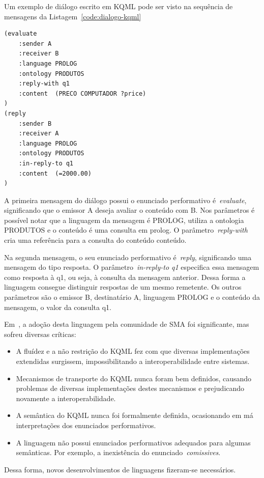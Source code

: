 Um exemplo de diálogo escrito em KQML pode ser visto na sequência de mensagens da Listagem~\ref{code:dialogo-kqml}

\begin{lstlisting}[label=code:dialogo-kqml,caption=Exemplo de diálogo em KQML]
(evaluate
	:sender A
	:receiver B
	:language PROLOG
	:ontology PRODUTOS
	:reply-with q1
	:content  (PRECO COMPUTADOR ?price)
)
(reply
	:sender B
	:receiver A
	:language PROLOG
	:ontology PRODUTOS
	:in-reply-to q1
	:content  (=2000.00)
)
\end{lstlisting}

A primeira mensagem do diálogo possui o enunciado performativo é~\emph{evaluate}, significando que o emissor A deseja avaliar o conteúdo com B. Nos parâmetros é possível notar que a linguagem da mensagem é PROLOG, utiliza a ontologia PRODUTOS e o conteúdo é uma consulta em prolog. O parâmetro~\emph{reply-with} cria uma referência para a consulta do conteúdo conteúdo.

Na segunda mensagem, o seu enunciado performativo é~\emph{reply}, significando uma mensagem do tipo resposta. O parâmetro~\emph{in-reply-to q1} especifica essa mensagem como resposta à q1, ou seja, à consulta da mensagem anterior. Dessa forma a linguagem consegue distinguir respostas de um mesmo remetente. Os outros parâmetros são o emissor B, destinatário A, linguagem PROLOG e o conteúdo da mensagem, o valor da consulta q1.

Em~\cite{wooldridge04}, a adoção desta linguagem pela comunidade de SMA foi significante, mas sofreu diversas críticas:
\begin{itemize}
	\item A fluídez e a não restrição do KQML fez com que diversas implementações extendidas surgissem, impossibilitando a interoperabilidade entre sistemas.
	\item Mecanismos de transporte do KQML nunca foram bem definidos, causando problemas de diversas implementações destes mecanismos e prejudicando novamente a interoperabilidade.
	\item A semântica do KQML nunca foi formalmente definida, ocasionando em má interpretações dos enunciados performativos.
	\item A linguagem não possui enunciados performativos adequados para algumas semânticas. Por exemplo, a inexistência do enunciado~\emph{comissives}.
\end{itemize}

Dessa forma, novos desenvolvimentos de linguagens fizeram-se necessários.

